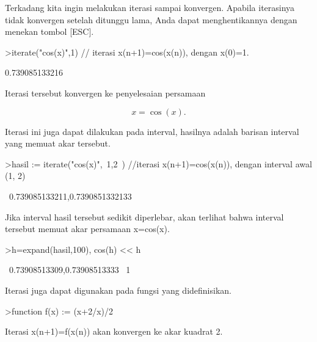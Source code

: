 \documentclass[a4paper,10pt]{article}
\begin{document}
\begin{eulernotebook}
\begin{eulercomment}
\begin{eulercomment}
\begin{eulercomment}
\begin{eulercomment}
\begin{eulercomment}
\begin{eulercomment}
\begin{eulercomment}
\begin{eulercomment}
\begin{eulercomment}
\begin{eulercomment}
\begin{eulercomment}
\begin{eulercomment}
\begin{eulercomment}
\begin{eulercomment}
\begin{eulercomment}
\begin{eulercomment}
\begin{eulercomment}
\begin{eulercomment}
\begin{eulercomment}
Terkadang kita ingin melakukan iterasi sampai konvergen. Apabila iterasinya tidak konvergen
setelah ditunggu lama, Anda dapat menghentikannya dengan menekan tombol [ESC].
\end{eulercomment}
\begin{eulerprompt}
>iterate("cos(x)",1) // iterasi x(n+1)=cos(x(n)), dengan x(0)=1.
\end{eulerprompt}
\begin{euleroutput}
  0.739085133216
\end{euleroutput}
\begin{eulercomment}
Iterasi tersebut konvergen ke penyelesaian persamaan

\end{eulercomment}
\begin{eulerformula}
\[
x = \cos(x).
\]
\end{eulerformula}
\begin{eulercomment}
Iterasi ini juga dapat dilakukan pada interval, hasilnya adalah barisan interval yang memuat
akar tersebut.
\end{eulercomment}
\begin{eulerprompt}
>hasil := iterate("cos(x)",~1,2~) //iterasi x(n+1)=cos(x(n)), dengan interval awal (1, 2)
\end{eulerprompt}
\begin{euleroutput}
  ~0.739085133211,0.7390851332133~
\end{euleroutput}
\begin{eulercomment}
Jika interval hasil tersebut sedikit diperlebar, akan terlihat bahwa interval tersebut
memuat akar persamaan x=cos(x).
\end{eulercomment}
\begin{eulerprompt}
>h=expand(hasil,100), cos(h) << h
\end{eulerprompt}
\begin{euleroutput}
  ~0.73908513309,0.73908513333~
  1
\end{euleroutput}
\begin{eulercomment}
Iterasi juga dapat digunakan pada fungsi yang didefinisikan.
\end{eulercomment}
\begin{eulerprompt}
>function f(x) := (x+2/x)/2
\end{eulerprompt}
\begin{eulercomment}
Iterasi x(n+1)=f(x(n)) akan konvergen ke akar kuadrat 2.
\end{eulercomment}

\end{eulercomment}
\end{eulercomment}
\end{eulercomment}
\end{eulercomment}
\end{eulercomment}
\end{eulercomment}
\end{eulercomment}
\end{eulercomment}
\end{eulercomment}
\end{eulercomment}
\end{eulercomment}
\end{eulercomment}
\end{eulercomment}
\end{eulercomment}
\end{eulercomment}
\end{eulercomment}
\end{eulercomment}
\end{eulercomment}
\end{eulernotebook}
\end{document}
